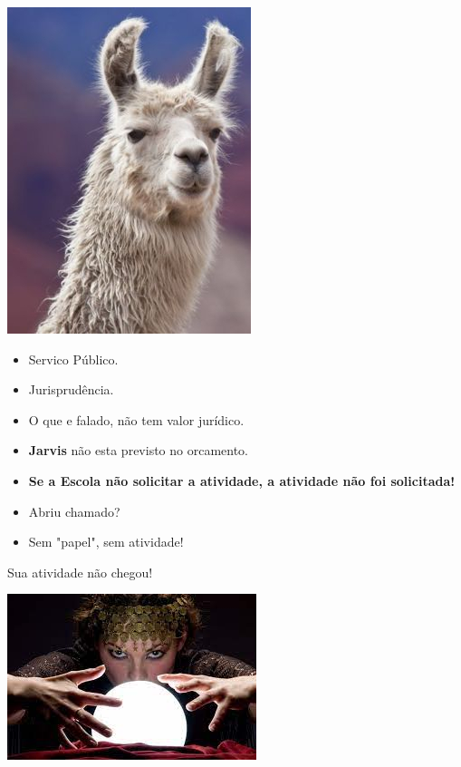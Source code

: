 {\begin{center}
\end{center}

\vfill
\pagebreak


\begin{multicols}{2}
	
	\begin{center}
		\includegraphics[height=\textheight]{./IMG-GIT/lhama.jpg}
		
	\end{center}		
	
	\begin{itemize}
		
		\large
		\item Servico Público.
		\item Jurisprudência.
		\item O que e falado, não tem valor jurídico.
		\item \textbf{Jarvis} não esta previsto no orcamento.
		\item \textbf{Se a Escola não solicitar a atividade, a atividade não foi solicitada!}
		\item Abriu chamado?
		\item Sem "papel", sem atividade!
	\end{itemize}
\end{multicols}

\begin{center}
	\begin{center}
		\LARGE Sua atividade não chegou!
		
		\vspace*{2mm}
		\includegraphics[height=.9\textheight]{./IMG-GIT/cristal.jpg}
	\end{center}
\end{center}

}
